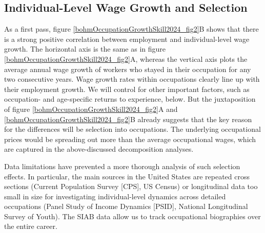 \documentclass[12pt]{article}
\newcommand{\highlightP}[1]{{\emph{\color{MyPink}{#1}}}}
\theoremstyle{definition}
\begin{document}
\subsection{Individual-Level Wage Growth and Selection}

As a first pass, figure \ref{bohmOccupationGrowthSkill2024_fig2}B shows that there is a strong positive correlation between employment and individual-level wage growth. The horizontal axis is the same as in figure \ref{bohmOccupationGrowthSkill2024_fig2}A, whereas the vertical axis plots the average annual wage growth of workers who stayed in their occupation for any two consecutive years. Wage growth rates within occupations clearly line up with their employment growth. We will control for other important factors, such as occupation- and age-specific returns to experience, below. But the juxtaposition of figure \ref{bohmOccupationGrowthSkill2024_fig2}A and \ref{bohmOccupationGrowthSkill2024_fig2}B already suggests that the key reason for the differences will be selection into occupations. \highlightP{Put differently, demand shifts will indeed be driving the changes of employment and prices paid for skilled labor across occupations. Negative selection of entrants into growing occupations obscures this relation when looking at average occupation-specific wages.} The underlying occupational prices would be spreading out more than the average occupational wages, which are captured in the above-discussed decomposition analyses.

Data limitations have prevented a more thorough analysis of such selection effects. In particular, the main sources in the United States are repeated cross sections (Current Population Survey [CPS], US Census) or longitudinal data too small in size for investigating individual-level dynamics across detailed occupations (Panel Study of Income Dynamics [PSID], National Longitudinal Survey of Youth). The SIAB data allow us to track occupational biographies over the entire career.
\end{document}
